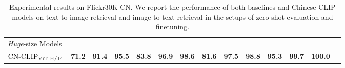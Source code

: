 \documentclass[11pt]{article}
\begin{document}
\begin{table*}[t]
\begin{adjustbox}{max width=1.\textwidth}
\begin{tabular}{@{\extracolsep{\fill}}lccccccccccccc}
    \\
\midrule
    \multicolumn{9}{l}{\textit{Huge}-size Models} \\
    $\text{CN-CLIP}\rm_{ViT\text{-}H/14}$
    & \textbf{71.2}	& \textbf{91.4}	& \textbf{95.5}	& \textbf{83.8}	& \textbf{96.9}	& \textbf{98.6}	& \textbf{81.6}	& \textbf{97.5}	& \textbf{98.8}	& \textbf{95.3}	& \textbf{99.7}	& \textbf{100.0}
    \\
\bottomrule
\end{tabular}
\end{adjustbox}
\caption{Experimental results on Flickr30K-CN. We report the performance of both baselines and Chinese CLIP models on text-to-image retrieval and image-to-text retrieval in the setups of zero-shot evaluation and finetuning. }
\label{tb:flickr}
\end{table*}
\end{document}
